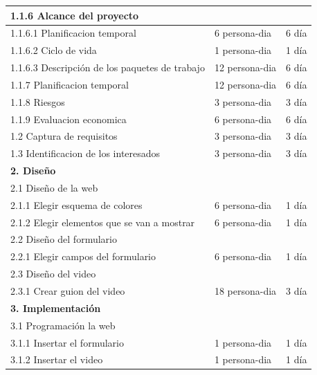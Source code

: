 \documentclass{report}
\begin{document}
\begin{center}
\begin{longtable}{|p{7cm}|p{3cm}|p{3cm}|}
                \hline
                1.1.6 Alcance del proyecto &  & \\
                \hline
                1.1.6.1 Planificacion temporal & 6 persona-dia & 6 día\\
                \hline
                1.1.6.2 Ciclo de vida & 1 persona-dia & 1 día\\
                \hline
                1.1.6.3 Descripción de los paquetes de trabajo & 12 persona-dia & 6 día\\
                \hline
                1.1.7 Planificacion temporal & 12 persona-dia & 6 día\\
                \hline
                1.1.8 Riesgos & 3 persona-dia & 3 día\\
                \hline
                1.1.9 Evaluacion economica & 6 persona-dia & 6 día\\
                \hline
                1.2 Captura de requisitos & 3 persona-dia & 3 día\\
                \hline
                1.3 Identificacion de los interesados & 3 persona-dia & 3 día\\
                \hline
                \textbf{2. Diseño} &  & \\
                \hline
                2.1 Diseño de la web &  & \\
                \hline
                2.1.1 Elegir esquema de colores & 6 persona-dia & 1 día\\
                \hline
                2.1.2 Elegir elementos que se van a mostrar & 6 persona-dia & 1 día\\
                \hline
                2.2 Diseño del formulario\\
                \hline
                2.2.1 Elegir campos del formulario & 6 persona-dia & 1 día\\
                \hline
                2.3 Diseño del video & & \\
                \hline
                2.3.1 Crear guion del video & 18 persona-dia & 3 día\\
                \hline
                \textbf{3. Implementación} &  & \\
                \hline
                3.1 Programación la web &  & \\
                \hline
                3.1.1 Insertar el formulario & 1 persona-dia & 1 día\\
                \hline
                3.1.2 Insertar el video & 1 persona-dia & 1 día\\

\end{longtable}
\end{center}
\end{document}
